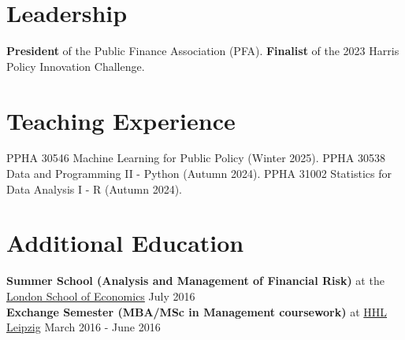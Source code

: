 \renewcommand{\subsection}[3]{
    \noindent\textbf{#1}  {#2} \hfill #3
}
\section{Leadership}
\textbf{President} of the Public Finance Association (PFA). \textbf{Finalist} of the 2023 Harris Policy Innovation Challenge. %

\section{Teaching Experience}
PPHA 30546 Machine Learning for Public Policy (Winter 2025). PPHA 30538 Data and Programming II - Python (Autumn 2024). PPHA 31002 Statistics for Data Analysis I - R (Autumn 2024).

\section{Additional Education}
\subsection{Summer School (Analysis and Management of Financial Risk)}{at the \href{https://www.lse.ac.uk/}{London School of Economics}}{July 2016} \\
\subsection{Exchange Semester (MBA/MSc in Management coursework)}{at \href{https://www.hhl.de/}{HHL Leipzig}}{March 2016 - June 2016} 